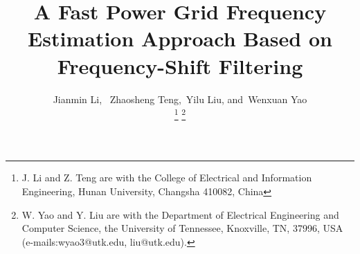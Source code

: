 \documentclass[journal,twoside]{IEEEtran}
\begin{document}
%
\title{A Fast Power Grid Frequency Estimation Approach Based on Frequency-Shift Filtering}
%
%
%
\author{Jianmin  Li,~
		Zhaosheng Teng,~Yilu Liu,
		and~Wenxuan Yao%
		
		\vspace*{-30pt}		
		\thanks{J.  Li and Z. Teng are with the College of Electrical and Information Engineering, Hunan University, Changsha 410082, China} %
		\thanks{W. Yao and Y. Liu are with the Department of Electrical Engineering and Computer Science, the University of Tennessee, Knoxville, TN, 37996, USA (e-mails:wyao3@utk.edu, liu@utk.edu).}
		}%

% 
%

{}
% 
\end{document}
